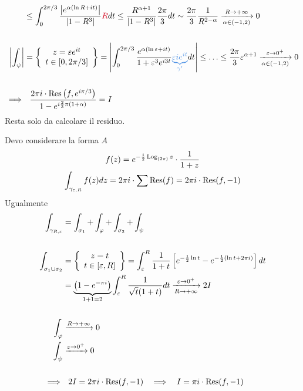 \begin{equation*}
\begin{aligned}
 & \leq \int^{2\pi /3}_{0}\frac{\left| e^{\alpha (\ln R + it)}\right|}{\left| 1 - R^{3}\right|}\textcolor[rgb]{0.82, 0.01, 0.11}{R} dt \leq \frac{R^{\alpha + 1}}{\left| 1 - R^{3}\right|}\frac{2\pi}{3} dt\sim \frac{2\pi}{3}\frac{1}{R^{2 - \alpha}}\xrightarrow[\alpha \in (- 1, 2)]{R\rightarrow + \infty} 0\\
 & \\
\left| \int_{\psi}\right|  & = \left\{
\begin{array}{c}
z = \varepsilon e^{it}\\
t\in [ 0, 2\pi /3]
\end{array}\right\} = \left| \int^{2\pi /3}_{0}\frac{e^{\alpha (\ln \varepsilon + it)}}{1 + \varepsilon^{3} e^{i3t}}\textcolor[rgb]{0.29, 0.56, 0.89}{\underbrace{\varepsilon ie^{it}}_{\gamma '}} dt\right| \leq \dotsc \leq \frac{2\pi}{3} \varepsilon^{\alpha + 1}\xrightarrow[\alpha \in (- 1, 2)]{\varepsilon \rightarrow 0^{+}} 0\\
 & \\
\implies  & \ \ \frac{2\pi i \cdot \Res \left(f, e^{i\pi /3}\right)}{1 - e^{i\frac{2}{3} \pi (1 + \alpha)}} = I
\end{aligned}
\end{equation*}
Resta solo da calcolare il residuo.
\Soluzione

Devo considerare la forma $A$
\begin{gather*}
f(z) = e^{- \frac{1}{2}\operatorname{Log}_{(2\pi)} z} \cdot \frac{1}{1 + z}\\
\int_{\gamma_{\varepsilon, R}} f(z) dz = 2\pi i \cdot \sum \operatorname{Res} (f) = 2\pi i \cdot \operatorname{Res} (f, - 1)
\end{gather*}
Ugualmente
\begin{equation*}
\begin{aligned}
\int_{\gamma_{R, \varepsilon}} & = \int_{\sigma_{1}} + \int_{\varphi} + \int_{\sigma_{2}} + \int_{\psi}\\
 & \\
\int_{\sigma_{1} \cup \sigma_{2}} & = \left\{
\begin{array}{c}
z = t\\
t\in [ \varepsilon, R]
\end{array}\right\} = \int^{R}_{\varepsilon}\frac{1}{1 + t}\left[ e^{- \frac{1}{2}\ln t} - e^{- \frac{1}{2}(\ln t + 2\pi i)}\right] dt\\
 & = \underbrace{\left(1 - e^{- \pi i}\right)}_{1 + 1 = 2}\int^{R}_{\varepsilon}\frac{1}{\sqrt{t}(1 + t)} dt\xrightarrow[R\rightarrow + \infty ]{\varepsilon \rightarrow 0^{+}} 2I\\
 & \\
\int_{\varphi} & \xrightarrow{R\rightarrow + \infty} 0\\
\int_{\psi} & \xrightarrow{\varepsilon \rightarrow 0^{+}} 0\\
 & \\
\implies  & \ \ 2I = 2\pi i \cdot \operatorname{Res} (f, - 1) \ \ \implies \ \ I = \pi i \cdot \operatorname{Res} (f, - 1)
\end{aligned}
\end{equation*}
\Soluzione

